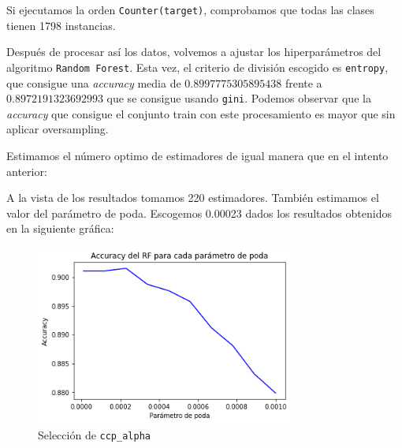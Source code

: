 \documentclass[a4]{article}
\begin{document}
Si ejecutamos la orden \texttt{Counter(target)}, comprobamos que todas las clases tienen 1798 instancias.

Después de procesar así los datos, volvemos a ajustar los hiperparámetros del algoritmo \texttt{Random Forest}. Esta vez, el criterio de división escogido es \texttt{entropy}, que consigue una \textit{accuracy} media de $0.8997775305895438$ frente a $0.8972191323692993$ que se consigue usando \texttt{gini}. Podemos observar que la \textit{accuracy} que consigue el conjunto train con este procesamiento es mayor que sin aplicar oversampling.

Estimamos el número optimo de estimadores de igual manera que en el intento anterior:

\begin{figure}[H]
  \centering
\end{figure}

A la vista de los resultados tomamos 220 estimadores. También estimamos el valor del parámetro de poda. Escogemos 0.00023 dados los resultados obtenidos en la siguiente gráfica:

\begin{figure}[H]
  \centering
  \caption{Selección de \texttt{ccp\_alpha}}
  \includegraphics[width=85mm]{imagenes/p3_01_ccp_alpha}
\end{figure}
\end{document}
